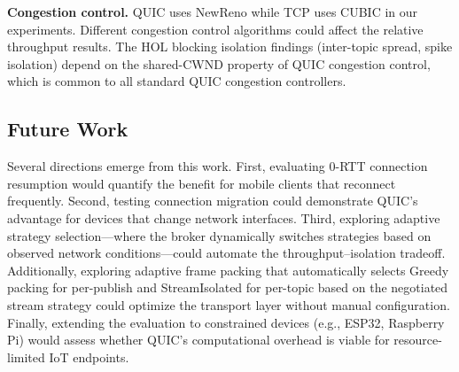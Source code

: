 \textbf{Congestion control.} QUIC uses NewReno while TCP uses CUBIC in our experiments. Different congestion control algorithms could affect the relative throughput results. The HOL blocking isolation findings (inter-topic spread, spike isolation) depend on the shared-CWND property of QUIC congestion control, which is common to all standard QUIC congestion controllers.

\subsection{Future Work}

Several directions emerge from this work. First, evaluating 0-RTT connection resumption would quantify the benefit for mobile clients that reconnect frequently. Second, testing connection migration could demonstrate QUIC's advantage for devices that change network interfaces. Third, exploring adaptive strategy selection---where the broker dynamically switches strategies based on observed network conditions---could automate the throughput--isolation tradeoff. Additionally, exploring adaptive frame packing that automatically selects Greedy packing for per-publish and StreamIsolated for per-topic based on the negotiated stream strategy could optimize the transport layer without manual configuration. Finally, extending the evaluation to constrained devices (e.g., ESP32, Raspberry Pi) would assess whether QUIC's computational overhead is viable for resource-limited IoT endpoints.
